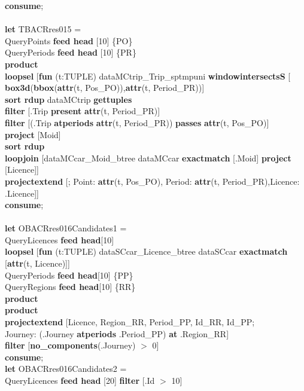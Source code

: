 \documentclass[a4paper]{article}
\newcommand{\op}[1]{\textbf{#1}}
\begin{document}
\begin{scriptsize}
\begin{tabbing}
\op{consume};\\
\\
\op{let} TBACRres015 =\\
\>QueryPoints  \op{feed head} [10] \{PO\}\\
\>QueryPeriods \op{feed head} [10] \{PR\}\\
\>\op{product}\\
\>\op{loopsel} [\op{fun} (t:TUPLE) dataMCtrip\_Trip\_sptmpuni \op{windowintersectsS} [\\
\>\>\>\>\op{box3d}(\op{bbox}(\op{attr}(t, Pos\_PO)),\op{attr}(t, Period\_PR))]\\
\>\>\op{sort rdup} dataMCtrip \op{gettuples}\\
\>\>\op{filter} [.Trip \op{present} \op{attr}(t, Period\_PR)]\\
\>\>\op{filter} [(.Trip \op{atperiods} \op{attr}(t, Period\_PR)) \op{passes} \op{attr}(t, Pos\_PO)]\\
\>\>\op{project} [Moid]\\
\>\>\op{sort rdup}\\
\>\>\op{loopjoin} [dataMCcar\_Moid\_btree dataMCcar \op{exactmatch} [.Moid] \op{project} [Licence]]\\
\>\>\op{projectextend} [; Point: \op{attr}(t, Pos\_PO), Period: \op{attr}(t, Period\_PR),Licence: .Licence]]\\
\op{consume};\\
\\
\op{let} OBACRres016Candidates1 =\\
\>QueryLicences \op{feed head}[10]\\
\>\>\>\op{loopsel} [\op{fun} (t:TUPLE) dataSCcar\_Licence\_btree dataSCcar \op{exactmatch} [\op{attr}(t, Licence)]]\\
\>\>QueryPeriods \op{feed head}[10] \{PP\}\\
\>\>QueryRegions \op{feed head}[10] \{RR\}\\
\>\>\op{product}\\
\>\op{product}\\
\>\op{projectextend} [Licence, Region\_RR, Period\_PP, Id\_RR, Id\_PP;\\
\>\>\>Journey: (.Journey \op{atperiods} .Period\_PP) \op{at} .Region\_RR]\\
\>\op{filter} [\op{no\_components}(.Journey) $>$ 0]\\
\op{consume};\\
\op{let} OBACRres016Candidates2 =\\
\>QueryLicences \op{feed head} [20] \op{filter} [.Id $>$ 10]\\

\end{tabbing}
\end{scriptsize}
\end{document}
